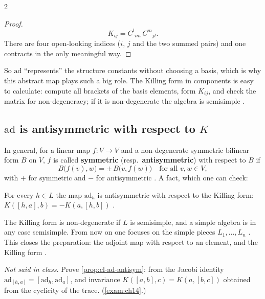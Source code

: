 \begin{paracol}{2}
\begin{proof}
\[
  K_{ij}=C^l{}_{im}\,C^m{}_{jl}.
\]
There are four open-looking indices ($i$, $j$ and the two summed pairs) and one contracts in the only meaningful way.        
\end{proof}
So $\mathrm{ad}$ ``represents'' the structure constants without choosing a basis, which is why this abstract map plays such a big role. The Killing form in components is easy to calculate: compute all brackets of the basis elements, form $K_{ij}$, and check the matrix for non-degeneracy; if it is non-degenerate the algebra is semisimple   .

\subsection{$\mathrm{ad}$ is antisymmetric with respect to $K$}\label{sec:cl-antisym}
In general, for a linear map $f\colon V\to V$ and a non-degenerate symmetric bilinear form $B$ on $V$, $f$ is called \textbf{symmetric} (resp.\ \textbf{antisymmetric}) with respect to $B$ if
\[
  B\bigl(f(v),w\bigr)=\pm\,B\bigl(v,f(w)\bigr)\quad\text{for all }v,w\in V,
\]
with $+$ for symmetric and $-$ for antisymmetric     . A fact, which one can check:
\begin{proposition}\label{prop:cl-ad-antisym}
For every $h\in L$ the map $\mathrm{ad}_h$ is antisymmetric with respect to the Killing form: $K([h,a],b)=-K(a,[h,b])$  .
\end{proposition}
The Killing form is non-degenerate if $L$ is semisimple, and a simple algebra is in any case semisimple. From now on one focuses on the simple pieces $L_1,\dots,L_n$  . This closes the preparation: the adjoint map with respect to an element, and the Killing form .
\begin{exercise}\label{ex:cl-ad-antisym}
\emph{Not said in class.} Prove \cref{prop:cl-ad-antisym}: from the Jacobi identity $\mathrm{ad}_{[h,a]}=[\mathrm{ad}_h,\mathrm{ad}_a]$, and invariance $K([a,b],c)=K(a,[b,c])$ obtained from the cyclicity of the trace. (\cref{exam:ch14}.)
\end{exercise}


\end{paracol}
